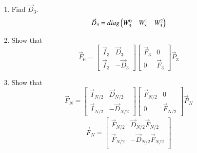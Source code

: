 \documentclass[journal,12pt,twocolumn]{IEEEtran}
\renewcommand\thesection{\arabic{section}}
\begin{document}
\begin{enumerate}[label=\arabic*.,ref=\thesection.\theenumi]
			\item Find $\vec{D}_3$.\\
			\solution 	
			\begin{align}
				\vec{D}_3 = diag\begin{pmatrix}W_{3}^{0} & W_{3}^{1} & W_{3}^{2}\end{pmatrix}
			\end{align}
			\item Show that 
			\begin{equation}
				\vec{F}_{6}=
				\begin{bmatrix}
					\vec{I}_{3} & \vec{D}_{3} \\
					\vec{I}_{3} & -\vec{D}_{3}
				\end{bmatrix}
				\begin{bmatrix}
					\vec{F}_{3} & 0 \\
					0 & \vec{F}_{3}
				\end{bmatrix}
				\vec{P}_{3}
			\end{equation}
			\item Show that 
			\begin{equation}
				\vec{F}_{N}=
				\begin{bmatrix}
					\vec{I}_{N/2} & \vec{D}_{N/2} \\
					\vec{I}_{N/2} & -\vec{D}_{N/2}
				\end{bmatrix}
				\begin{bmatrix}
					\vec{F}_{N/2} & 0 \\
					0 & \vec{F}_{N/2}
				\end{bmatrix}
				\vec{P}_{N}
			\end{equation}
			\solution
			\begin{align}
				\vec{F}_N = 
				\begin{bmatrix}
					\vec{F}_{N/2} & \vec{D}_{N/2} \vec{F}_{N/2}\\
					\vec{F}_{N/2} & -\vec{D}_{N/2} \vec{F}_{N/2}\\
				\end{bmatrix}
			\end{align}
			

\end{enumerate}
\end{document}
